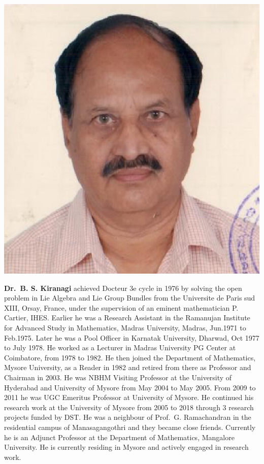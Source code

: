 \centerline{\includegraphics[scale=.5]{authorsphotos/Prof_B_S_Kiranagi.eps}}
\bigskip

\noindent
\textbf{Dr.\ B. S. Kiranagi} achieved Docteur 3e cycle in 1976 by solving the open problem in Lie Algebra and Lie Group Bundles from the Universite de Paris sud XIII, Orsay, France, under the supervision of an eminent mathematician P. Cartier, IHES. Earlier he was a Research Assistant in the Ramanujan Institute for Advanced Study in Mathematics, Madras University, Madras, Jun.1971 to Feb.1975. Later he was a Pool Officer in Karnatak University, Dharwad, Oct 1977 to July 1978. He worked as a Lecturer in Madras University PG Center at Coimbatore, from 1978 to 1982. He then joined the Department of Mathematics, Mysore University, as a Reader in 1982 and retired from there as Professor and Chairman in 2003. He was NBHM Visiting Professor at the University of Hyderabad and University of Mysore from May 2004 to May 2005. From 2009 to 2011 he was UGC Emeritus Professor at University of Mysore. He continued his research work at the University of Mysore from 2005 to 2018 through 3 research projects funded by DST. He was a neighbour of Prof.\ G. Ramachandran in the residential campus of Manasagangothri and they became close friends. Currently he is an Adjunct Professor at the Department of Mathematics, Mangalore University. He is currently residing in Mysore and actively engaged in research work.

